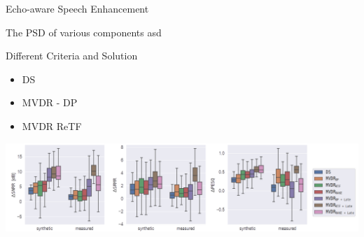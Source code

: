 \begin{frame}[t]{Echo-aware Speech Enhancement}

    \begin{block}{The PSD of various components}
        asd
    \end{block}

    \begin{block}{Different Criteria and Solution}
        \begin{itemize}
            \item DS
            \item MVDR - DP
            \item MVDR ReTF
        \end{itemize}
    \end{block}

    \begin{center}
        \includegraphics[width=\textwidth]{figures/dechorate/kowalkzy_results_boxplot_alpha.png}
    \end{center}

\end{frame}



